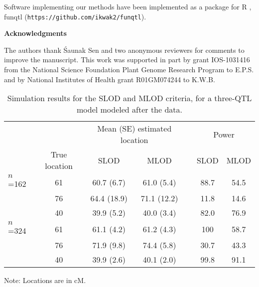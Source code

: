 \documentclass[12pt,letterpaper]{article}
\begin{document}
Software implementing our methods have been implemented as a package
for R \citep{R}, funqtl
({\small \verb|https://github.com/ikwak2/funqtl|}).



\clearpage
\centerline{\sffamily \textbf{Acknowledgments}}
The authors thank \'Saunak Sen and two anonymous
reviewers for
comments to improve the manuscript.
This work was supported in part by grant IOS-1031416 from the National
Science Foundation Plant Genome Research Program to E.P.S. and by
National Institutes of Health grant R01GM074244 to K.W.B.

\clearpage

\renewcommand*{\refname}{\centerline{\sffamily \normalsize \textbf{Literature Cited}}}



\newpage

\renewcommand{\arraystretch}{2}
\begin{table}[!ht]
  \caption{Simulation results for the SLOD and MLOD criteria, for a
    three-QTL model modeled after the \citet{Moore2013} data.\label{table1}}
  \begin{center}
    \begin{tabular}{lcccccc}
      \hline
      & & \multicolumn{2}{c}{Mean (SE) estimated location} & &
      \multicolumn{2}{c}{Power} \\ \cline{3-4}\cline{6-7}
      & True location & SLOD & MLOD && SLOD & MLOD \\ \hline
      $n$=162         & 61 & 60.7 (6.7) & 61.0 (5.4) && 88.7 & 54.5 \\
                      & 76 & 64.4 (18.9) & 71.1 (12.2) && 11.8 & 14.6 \\
                      & 40 & 39.9 (5.2) & 40.0 (3.4) && 82.0 & 76.9 \\ \hline
      $n$=324         & 61 & 61.1 (4.2) & 61.2 (4.3) && 100 & 58.7 \\
                      & 76 & 71.9 (9.8) & 74.4 (5.8) && 30.7 & 43.3 \\
                      & 40 & 39.9 (2.6) & 40.1 (2.0) && 99.8 & 91.1 \\ \hline
    \end{tabular}
  \end{center}

\bigskip

Note: Locations are in cM.

\end{table}



\newpage
\end{document}
